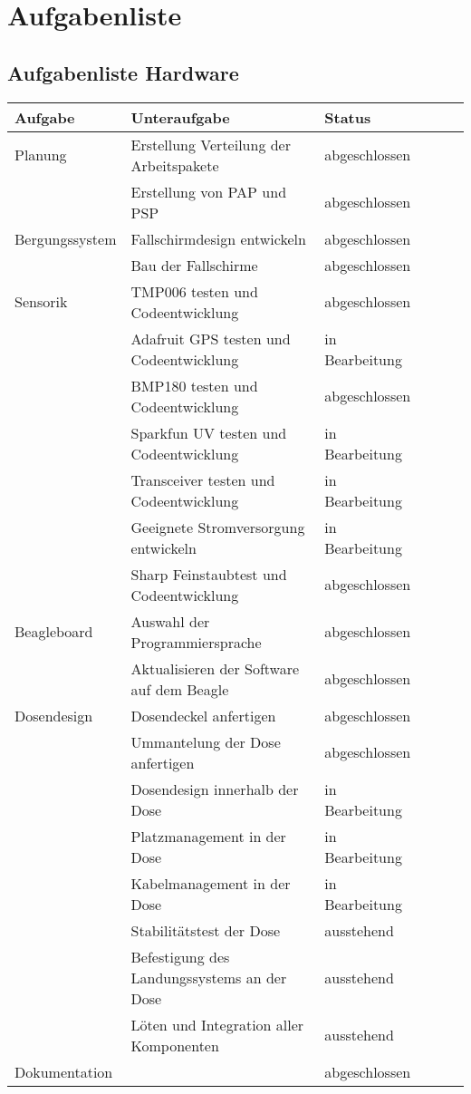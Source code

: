 \section{Aufgabenliste}

\subsection{Aufgabenliste Hardware}
\begin{table}[H]
  \centering
    \begin{tabular}{p{3cm}p{7cm}p{3cm}rrr}
    \toprule
    \textbf{Aufgabe} & \textbf{Unteraufgabe} & \textbf{Status} \\
    \midrule
	Planung & Erstellung Verteilung der Arbeitspakete & abgeschlossen \\
	& Erstellung von PAP und PSP & abgeschlossen \\
	\midrule
	Bergungssystem & Fallschirmdesign entwickeln & abgeschlossen\\
	& Bau der Fallschirme & abgeschlossen\\
	\midrule
	Sensorik & TMP006 testen und Codeentwicklung & abgeschlossen\\
	& Adafruit GPS testen und Codeentwicklung & in Bearbeitung\\
	& BMP180 testen und Codeentwicklung & abgeschlossen\\
	& Sparkfun UV testen und Codeentwicklung & in Bearbeitung\\
	& Transceiver testen und Codeentwicklung & in Bearbeitung\\
	& Geeignete Stromversorgung entwickeln & in Bearbeitung\\
	& Sharp Feinstaubtest und Codeentwicklung & abgeschlossen\\
	\midrule
	Beagleboard & Auswahl der Programmiersprache & abgeschlossen\\
	& Aktualisieren der Software auf dem Beagle & abgeschlossen\\
	\midrule
	Dosendesign & Dosendeckel anfertigen & abgeschlossen\\
	& Ummantelung der Dose anfertigen & abgeschlossen\\
	& Dosendesign innerhalb der Dose & in Bearbeitung\\
	& Platzmanagement in der Dose & in Bearbeitung\\
	& Kabelmanagement in der Dose & in Bearbeitung\\
	& Stabilitätstest der Dose & ausstehend\\
	& Befestigung des Landungssystems an der Dose & ausstehend\\
	& Löten und Integration aller Komponenten & ausstehend\\
  \midrule
  Dokumentation & & abgeschlossen \\
  \bottomrule
  \bottomrule
  \end{tabular}%
  \label{tab:aufgabenliste_hardware}%
\end{table}%

